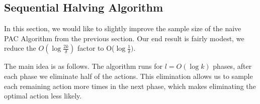 \subsection{Sequential Halving Algorithm}

In this section, we would like to slightly improve the sample size of the naive PAC Algorithm from the previous section. Our end result is fairly modest, we  reduce the $ O(\log\frac{2k}{\delta})$ factor to O($\log\frac{1}{\delta})$.

The main idea is as follows. The algorithm runs for $l=O(\log k)$ phases, after each phase we
eliminate half of the actions. This elimination allows us to sample
each remaining action more times in the next phase, which makes eliminating the optimal action less likely.

















